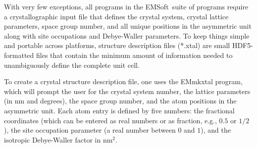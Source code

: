 \documentclass[DIV=calc, paper=letter, fontsize=11pt]{scrartcl}	 %
\newcommand{\ctp}{\textsf{EMSoft}}
\begin{document}
With very few exceptions, all programs in the \ctp\ suite of programs require a crystallographic input file that defines the 
crystal system, crystal lattice parameters, space group number, and all unique positions in the 
asymmetric unit along with site occupations and Debye-Waller parameters.  To keep things simple and 
portable across platforms, structure description files (*.xtal) are small HDF5-formatted files that contain the minimum
amount of information needed to unambiguously define the complete unit cell.  

To create a crystal structure description file, one uses the \textsf{EMmkxtal} program, which will prompt
the user for the crystal system number, the lattice parameters (in nm and degrees), the space group number,
and the atom positions in the asymmetric unit.  Each atom entry is defined by five numbers: the fractional
coordinates (which can be entered as real numbers or as fraction, e.g., $0.5$ or $1/2$), the site 
occupation parameter (a real number between $0$ and $1$), and the isotropic Debye-Waller factor in nm$^{2}$.
\end{document}
